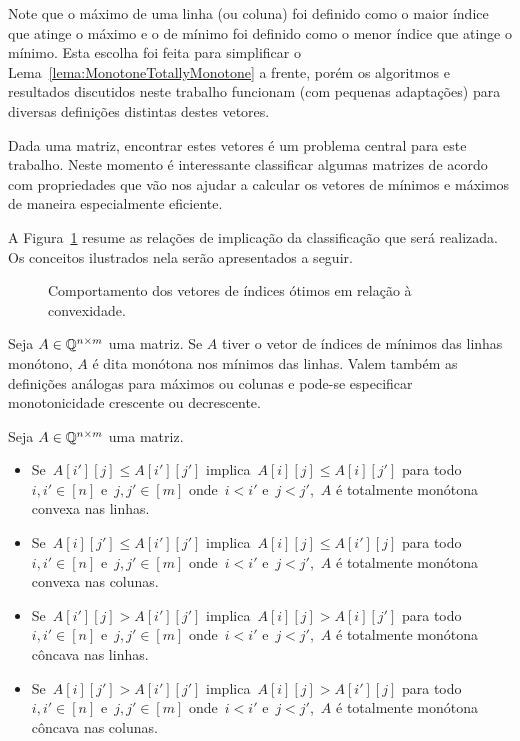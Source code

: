 Note que o máximo de uma linha (ou coluna) foi definido como o maior índice que atinge o máximo e o de mínimo foi definido como o menor índice que atinge o mínimo. Esta escolha foi feita para simplificar o Lema~\ref{lema:MonotoneTotallyMonotone} a frente, porém os algoritmos e resultados discutidos neste trabalho funcionam (com pequenas adaptações) para diversas definições distintas destes vetores.  

Dada uma matriz, encontrar estes vetores é um problema central para este trabalho. Neste momento é interessante classificar algumas matrizes de acordo com propriedades que vão nos ajudar a calcular os vetores de mínimos e máximos de maneira especialmente eficiente.   

A Figura~\ref{figure:ConvexMonotone} resume as relações de implicação da classificação que será realizada. Os conceitos ilustrados nela serão apresentados a seguir.

\begin{figure}[t]
    \centering
    
    \caption{Comportamento dos vetores de índices ótimos em relação à convexidade.} \label{figure:ConvexMonotone}
\end{figure}

\begin{defi}
Seja $A \in \mathbb{Q}^{n \times m}$ uma matriz. Se $A$ tiver o vetor de índices de mínimos das linhas monótono, $A$ é dita monótona nos mínimos das linhas. Valem também as definições análogas para máximos ou colunas e pode-se especificar monotonicidade crescente ou decrescente.
\end{defi}

\begin{defi}
Seja $A \in \mathbb{Q}^{n \times m}$ uma matriz.
    \begin{itemize}
        \item Se~$A[i'][j] \leq A[i'][j']$ implica~$A[i][j] \leq A[i][j']$ para todo~${i,i' \in [n]}$ e~${j,j' \in [m]}$ onde~${i<i'}$ e~${j<j'}$,~$A$ é totalmente monótona convexa nas linhas.
        \item Se~$A[i][j'] \leq A[i'][j']$ implica~$A[i][j] \leq A[i'][j]$ para todo~${i,i' \in [n]}$ e~${j,j' \in [m]}$ onde~${i<i'}$ e~${j<j'}$,~$A$ é totalmente monótona convexa nas colunas.
        \item Se~$A[i'][j] > A[i'][j']$ implica~$A[i][j] > A[i][j']$ para todo~${i,i' \in [n]}$ e~${j,j' \in [m]}$ onde~${i<i'}$ e~${j<j'}$,~$A$ é totalmente monótona côncava nas linhas.
        \item Se~$A[i][j'] > A[i'][j']$ implica~$A[i][j] > A[i'][j]$ para todo~${i,i' \in [n]}$ e~${j,j' \in [m]}$ onde~${i<i'}$ e~${j<j'}$,~$A$ é totalmente monótona côncava nas colunas.
    \end{itemize}
\end{defi}


